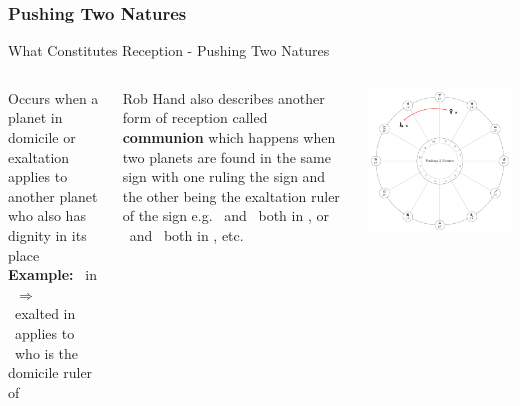 \subsubsection{Pushing Two Natures}
\begin{frame}[t]{What Constitutes Reception - Pushing Two Natures}
\begin{columns}[T, onlytextwidth]
Occurs when a planet in domicile or exaltation applies to another planet who also has dignity in its place\footnotemark[1] \\
\vspace{0.25cm}
\textbf{Example:} \Venus\ in \Pisces\ $\Rightarrow$ \Jupiter \\
\ul
\Venus\ exalted in \Pisces\ applies to \\
\Jupiter\ who is the domicile ruler of \Pisces \\
\vspace{0.25cm}

Rob Hand also describes another form of reception called \textbf{communion} which happens when two planets are found in the same sign with one ruling the sign and the other being the exaltation ruler of the sign e.g. \Moon\ and \Jupiter\ both in \Cancer, or \Mars\ and \Sun\ both in \Aries, etc.

\vspace{-0.5cm}
\begin{center}
{\includegraphics[width=\textwidth]{charts/01-pushing-two-natures}} \\
\end{center}

\end{columns}
\end{frame}

